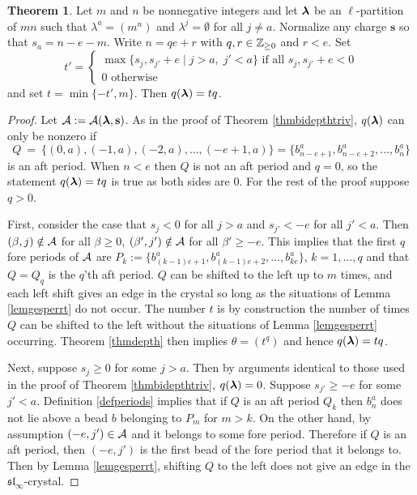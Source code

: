 \documentclass[12pt]{amsart}
\numberwithin{equation}{section}
\theoremstyle{definition}
\newtheorem{theorem}[equation]{Theorem}
\newcommand{\emp}{\emptyset}
\newcommand{\slinf}{\mathfrak{sl}_\infty}
\newcommand{\mbs}{\mathbf{s}}
\begin{document}
\begin{theorem}\label{thmdepthrectangle} Let $m$ and $n$ be nonnegative integers and let $\boldsymbol{\lambda}$ be an $\ell$-partition of $mn$ such that $\lambda^a=(m^n)$ and $\lambda^j=\emp$ for all $j\neq a$. Normalize any charge $\mbs$ so that $s_a=n-e-m$. Write $n=qe+r$ with $q,r\in\mathbb{Z}_{\geq0}$ and $r<e$. 
Set $$t'=\begin{cases} \max\{s_j,s_{j'}+e\;|\; j>a,\;j'<a\} \mbox{ if all } s_j,s_{j'}+e<0\\
0 \mbox{ otherwise }
\end{cases}$$ 
and set $t=\min\{-t',m\}$. Then $q(\boldsymbol{\lambda})=tq$.
\end{theorem}
\begin{proof}
Let $\cA:=\cA(\bla,\mbs)$. As in the proof of Theorem \ref{thmbidepthtriv}, $q(\boldsymbol{\lambda})$ can only be nonzero if 
 $$Q~=~\{(0,a),(-1,a),(-2,a),\dots,(-e+1,a)\}=\{b_{n-e+1}^a,b_{n-e+2}^a,\dots,b_n^a\}$$ is an aft period. When $n<e$ then $Q$ is not an aft period and $q=0$, so the statement $q(\boldsymbol{\lambda})=tq$ is true as both sides are $0$. For the rest of the proof suppose $q>0$. 
 
 First, consider the case that $s_j<0$ for all $j>a$ and $s_{j'}<-e$ for all $j'<a$. Then $(\beta,j)\notin\mathcal{A}$ for all $\beta\geq 0$, $(\beta',j')\notin\mathcal{A}$ for all $\beta'\geq -e$. This implies that the first $q$ fore periods of $\mathcal{A}$ are $P_k:=\{b_{(k-1)e+1}^a,b_{(k-1)e+2}^a,\dots,b_{ke}^a\}$, $k=1,\dots,q$ and that $Q=Q_q$ is the $q$'th aft period. $Q$ can be shifted to the left up to $m$ times, and each left shift gives an edge in the crystal so long as the situations of Lemma \ref{lemgesperrt} do not occur. The number $t$ is by construction the number of times $Q$ can be shifted to the left without the situations of Lemma \ref{lemgesperrt} occurring. Theorem \ref{thmdepth} then implies $\theta=(t^q)$ and hence $q(\boldsymbol{\lambda})=tq$.

Next, suppose $s_j\geq 0$ for some $j>a$. Then by arguments identical to those used in the proof of Theorem \ref{thmbidepthtriv}, $q(\boldsymbol{\lambda})=0$. Suppose $s_{j'}\geq -e$ for some $j'<a$. Definition \ref{defperiods} implies that if $Q$ is an aft period $Q_k$ then $b_n^a$ does not lie above a bead $b$ belonging to $P_m$ for $m>k$. On the other hand, by assumption $(-e,j')\in\mathcal{A}$ and it belongs to some fore period. Therefore if $Q$ is an aft period, then $(-e,j')$ is the first bead of the fore period that it belongs to.  Then by Lemma \ref{lemgesperrt}, shifting $Q$ to the left does not give an edge in the $\slinf$-crystal.
\end{proof}
\end{document}
